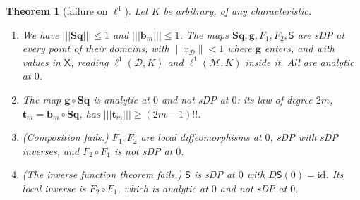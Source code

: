 \documentclass[11pt]{amsart}
\newtheorem{theorem}{Theorem}[section]
\theoremstyle{definition}
\theoremstyle{remark}
\numberwithin{equation}{section}
\newcommand{\id}{\mathrm{id}}
\newcommand{\norm}[1]{\lVert #1\rVert}
\theoremstyle{plain}
\theoremstyle{definition}
\theoremstyle{plain}
\begin{document}
\begin{theorem}[failure on $\ell^1$]\label{dp:thm:strong-failure}
Let $K$ be arbitrary, of any characteristic.
\begin{enumerate}
\item We have $\lvert\!\lvert\!\lvert \mathbf{Sq}\rvert\!\rvert\!\rvert\le1$ and $\lvert\!\lvert\!\lvert \mathbf b_m\rvert\!\rvert\!\rvert\le1$. The maps $\mathbf{Sq},\mathbf g,F_1,F_2,\mathsf S$ are sDP at every point of their domains, with $\norm{x_{\mathcal D}}<1$ where $\mathbf g$ enters, and with values in $\mathsf X$, reading $\ell^1(\mathcal D,K)$ and $\ell^1(\mathcal M,K)$ inside it. All are analytic at $0$.
\item The map $\mathbf g\circ\mathbf{Sq}$ is analytic at $0$ and not sDP at $0$: its law of degree $2m$, $\mathbf t_m=\mathbf b_m\circ\mathbf{Sq}$, has $\lvert\!\lvert\!\lvert \mathbf t_m\rvert\!\rvert\!\rvert\ge(2m-1)!!$.
\item \textup{(Composition fails.)} $F_1,F_2$ are local diffeomorphisms at $0$, sDP with sDP inverses, and $F_2\circ F_1$ is not sDP at $0$.
\item \textup{(The inverse function theorem fails.)} $\mathsf S$ is sDP at $0$ with $D\mathsf S(0)=\id$. Its local inverse is $F_2\circ F_1$, which is analytic at $0$ and not sDP at $0$.
\end{enumerate}
\end{theorem}
\end{document}
